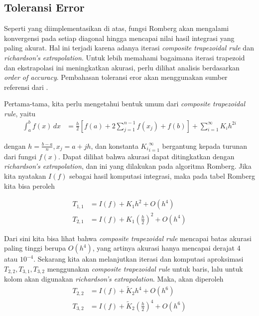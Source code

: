 \documentclass[journal,12pt,onecolumn,a4paper]{IEEEtran}
\begin{document}
\subsection{Toleransi Error}
Seperti yang diimplementasikan di atas, fungsi Romberg akan mengalami konvergensi pada setiap diagonal hingga mencapai nilai hasil integrasi yang paling akurat. Hal ini terjadi karena adanya iterasi \emph{composite trapezoidal rule} dan \emph{richardson's extrapolation}. Untuk lebih memahami bagaimana iterasi trapezoid dan ekstrapolasi ini meningkatkan akurasi, perlu dilihat analisis berdasarkan \emph{order of accuracy}. Pembahasan toleransi eror akan menggunakan sumber referensi dari \cite{jim_lamber}.

Pertama-tama, kita perlu mengetahui bentuk umum dari \emph{composite trapezoidal rule}, yaitu
\begin{equation*}
	\begin{split}
		\int_{a}^{b} f(x) \,dx & = \frac{h}{2}[f(a)+2\sum_{j=1}^{n-1}f(x_j)+f(b)]+\sum_{i=1}^{\infty}K_ih^{2i}
	\end{split}
\end{equation*}

dengan \(h=\frac{b-a}{n}, x_j = a+jh\), dan konstanta \({K_i}_{i=1}^{\infty}\) bergantung kepada turunan dari fungsi \(f(x)\). Dapat dilihat bahwa akurasi dapat ditingkatkan dengan \emph{richardson's extrapolation}, dan ini yang dilakukan pada algoritma Romberg.
Jika kita nyatakan \(I(f)\) sebagai hasil komputasi integrasi, maka pada tabel Romberg kita bisa peroleh

\begin{equation*}
	\begin{split}
		T_{1,1} & = I(f) + K_1h^2 +O(h^4) \\
		T_{2,1} & = I(f) + K_1(\frac{h}{2})^2 + O(h^4)
	\end{split}
\end{equation*}

Dari sini kita bisa lihat bahwa \emph{composite trapezoidal rule} mencapai batas akurasi paling tinggi berupa \(O(h^4)\), yang artinya akurasi hanya mencapai derajat 4 atau \(10^{-4}\).
Sekarang kita akan melanjutkan iterasi dan komputasi aproksimasi \(T_{2,2}, T_{3,1}, T_{3,2}\) menggunakan \emph{composite trapezoidal rule} untuk baris, lalu untuk kolom akan digunakan \emph{richardson's extrapolation}. Maka, akan diperoleh
\begin{equation*}
	\begin{split}
		T_{2,2} & = I(f) + \tilde{K}_2h^4 +O(h^6) \\
		T_{3,2} & = I(f) + \tilde{K}_2(\frac{h}{2})^4 + O(h^6)
	\end{split}
\end{equation*}
\end{document}
